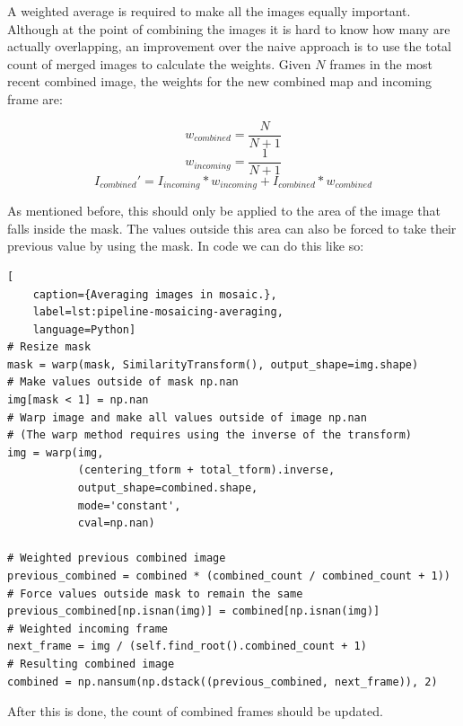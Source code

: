 A weighted average is required to make all the images equally important. Although at the point of combining the images it is hard to know how many are actually overlapping, an improvement over the naive approach is to use the total count of merged images to calculate the weights. Given \(N\) frames in the most recent combined image, the weights for the new combined map and incoming frame are:

\[w_{combined} = \frac{N}{N + 1}\]
\[w_{incoming} = \frac{1}{N + 1}\]
\[I_{combined}' = I_{incoming} * w_{incoming} + I_{combined} * w_{combined} \]

As mentioned before, this should only be applied to the area of the image that falls inside the mask. The values outside this area can also be forced to take their previous value by using the mask. In code we can do this like so:

\begin{lstlisting}[
    caption={Averaging images in mosaic.},
    label=lst:pipeline-mosaicing-averaging,
    language=Python]
# Resize mask 
mask = warp(mask, SimilarityTransform(), output_shape=img.shape)
# Make values outside of mask np.nan
img[mask < 1] = np.nan
# Warp image and make all values outside of image np.nan
# (The warp method requires using the inverse of the transform)
img = warp(img, 
           (centering_tform + total_tform).inverse, 
           output_shape=combined.shape, 
           mode='constant', 
           cval=np.nan)

# Weighted previous combined image
previous_combined = combined * (combined_count / combined_count + 1))
# Force values outside mask to remain the same
previous_combined[np.isnan(img)] = combined[np.isnan(img)]
# Weighted incoming frame
next_frame = img / (self.find_root().combined_count + 1)
# Resulting combined image
combined = np.nansum(np.dstack((previous_combined, next_frame)), 2)
\end{lstlisting}

After this is done, the count of combined frames should be updated.